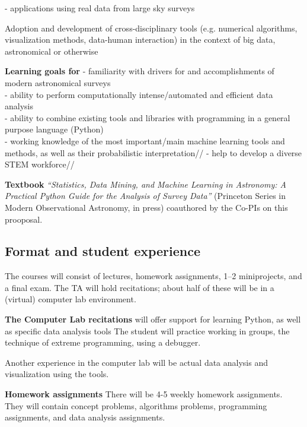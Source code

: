 - applications using real data from large sky surveys

Adoption and development of cross-disciplinary tools (e.g. numerical 
algorithms, visualization methods, data-human interaction) in the context
of big data, astronomical or otherwise 
\eit

{\bf Learning goals for \astrocl}
- familiarity with drivers for and accomplishments of modern astronomical surveys\\
- ability to perform computationally intense/automated and efficient data analysis\\
- ability to combine existing tools and libraries with programming in a general purpose language (Python)\\
- working knowledge of the most important/main machine learning tools and
   methods, as well as their probabilistic interpretation// 
- help to develop a diverse STEM workforce//
 


{\bf Textbook} {\it ``Statistics, Data Mining, and Machine Learning in
  Astronomy: A Practical Python Guide for the Analysis of Survey
  Data''} (Princeton Series in Modern Observational Astronomy, in
press) coauthored by the Co-PIs on this prooposal.


\subsection{Format and student experience}

The courses will consist of lectures, homework assignments, 1--2
miniprojects, and a final exam. The TA will hold recitations; about
half of these will be in a (virtual) computer lab environment. 

{\bf The Computer Lab recitations} will offer support for learning Python, as well as specific data analysis tools    The student will practice working in groups, the technique of extreme programming, using a debugger.

Another experience in the computer lab will be actual data analysis and visualization using the tools. 


{\bf Homework assignments} There will be 4-5 weekly homework assignments. They will contain concept problems, algorithms problems, programming assignments, and data analysis assignments.


